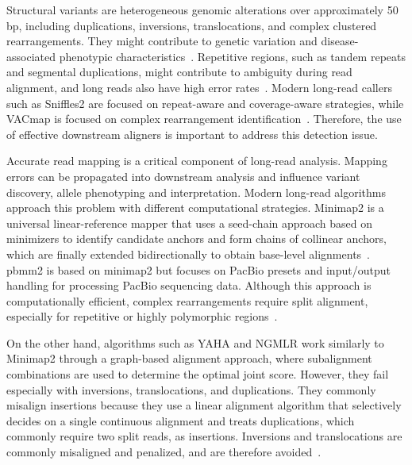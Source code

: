 \documentclass[12pt, letterpaper]{article}
\begin{document}
Structural variants are heterogeneous genomic alterations over approximately 50 bp, including duplications, inversions, translocations, and complex clustered rearrangements. They might contribute to genetic variation and disease-associated phenotypic characteristics~\cite{Helal2024,vacmap2025,Zook2020}. Repetitive regions, such as tandem repeats and segmental duplications, might contribute to ambiguity during read alignment, and long reads also have high error rates~\cite{vacmap2025}. Modern long-read callers such as Sniffles2 are focused on repeat-aware and coverage-aware strategies, while VACmap is focused on complex rearrangement identification~\cite{Smolka2024}. Therefore, the use of effective downstream aligners is important to address this detection issue.

Accurate read mapping is a critical component of long-read analysis. Mapping errors can be propagated into downstream analysis and influence variant discovery, allele phenotyping and interpretation. Modern long-read algorithms approach this problem with different computational strategies. Minimap2 is a universal linear-reference mapper that uses a seed-chain approach based on minimizers to identify candidate anchors and form chains of collinear anchors, which are finally extended bidirectionally to obtain base-level alignments~\cite{Li2018_Minimap2,vacmap2025}. pbmm2 is based on minimap2 but focuses on PacBio presets and input/output handling for processing PacBio sequencing data. Although this approach is computationally efficient, complex rearrangements require split alignment, especially for repetitive or highly polymorphic regions~\cite{vacmap2025,Liyanage2024,Wang2026}.

On the other hand, algorithms such as YAHA and NGMLR work similarly to Minimap2 through a graph-based alignment approach, where subalignment combinations are used to determine the optimal joint score. However, they fail especially with inversions, translocations, and duplications. They commonly misalign insertions because they use a linear alignment algorithm that selectively decides on a single continuous alignment and treats duplications, which commonly require two split reads, as insertions. Inversions and translocations are commonly misaligned and penalized, and are therefore avoided~\cite{vacmap2025}.

\end{document}
